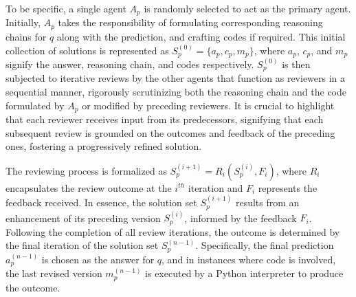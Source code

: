 To be specific, 
a single agent \(A_p\) is randomly selected to act as the primary agent.
Initially, 
\(A_p\) takes the responsibility of formulating corresponding reasoning chains for $q$ along with the prediction,
and crafting codes if required. 
This initial collection of solutions is represented as \(S_{p}^{(0)} = \{a_p, c_p, m_p\}\), 
where \(a_p\), \(c_p\), and \(m_p\) signify the answer, 
reasoning chain, and codes respectively. 
\(S_{p}^{(0)}\) is then subjected to iterative reviews by the other agents that function as reviewers in a sequential manner, 
rigorously scrutinizing both the reasoning chain and the code formulated by \(A_p\) or modified by preceding reviewers. 
It is crucial to highlight that each reviewer receives input from its predecessors, 
signifying that each subsequent review is grounded on the outcomes and feedback of the preceding ones, 
fostering a progressively refined solution.

The reviewing process is formalized as \( S_{p}^{(i+1)} = R_i(S_{p}^{(i)}, F_i) \), 
where \( R_i \) encapsulates the review outcome at the \( i^{th} \) iteration and \( F_i \) represents the feedback received. 
In essence, the solution set \( S_{p}^{(i+1)} \) results from an enhancement of its preceding version \( S_{p}^{(i)} \), 
informed by the feedback \( F_i \).
Following the completion of all review iterations, the outcome is determined by the final iteration of the solution set \( S_{p}^{(n-1)} \).
Specifically, 
the final prediction \( a_{p}^{(n-1)} \) is chosen as the answer for $q$, 
and in instances where code is involved, 
the last revised version \( m_{p}^{(n-1)} \) is executed by a Python interpreter to produce the outcome.
